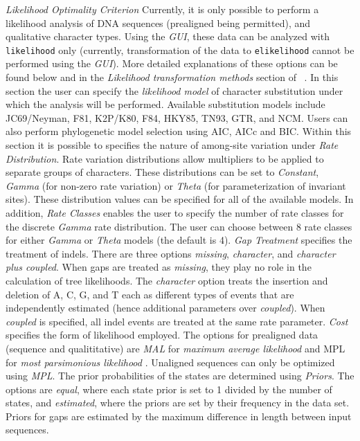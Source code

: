 \hangindent=1cm  \emph{Likelihood Optimality Criterion} Currently, it is only possible to perform 
a likelihood analysis of DNA sequences (prealigned being permitted), %
and qualitative 	character types. Using the \emph{GUI}, these data can be analyzed with 
\texttt{likelihood} only (currently, transformation of the data to \texttt{elikelihood} cannot be performed 
using the \emph{GUI}). More detailed explanations of these options can be found below and in the 
\emph{Likelihood transformation methods} section of  ~.
In this section the user can specify the \emph{likelihood model} of character 
substitution under which the analysis will be performed.  Available substitution models include JC69/Neyman, 
F81, K2P/K80, F84, HKY85, TN93, GTR, and NCM.  Users can also perform phylogenetic model 
selection using AIC, AICc and BIC.  Within this section it is possible to specifies 
the nature of among-site variation under \emph{Rate Distribution}.  Rate variation distributions allow 
multipliers to be applied to separate groups of characters. 
These distributions can be set to \emph{Constant}, \emph{Gamma} (for non-zero 
rate variation) or  \emph{Theta} (for parameterization of invariant sites).  These distribution
values can be specified for all of the available models. In addition, \emph{Rate Classes} enables the user to 
specify the number of rate classes for the discrete \emph{Gamma} rate distribution. 
The user can choose between 8 rate classes for either \emph{Gamma} or \emph{Theta}
models (the default is 4).  \emph{Gap Treatment}  specifies the treatment of indels.  There are 
three options \emph{missing},  \emph{character}, and \emph{character plus coupled}.  When gaps are treated 
as \emph{missing}, they play no role in the calculation of tree likelihoods.  The \emph{character} 
option treats the insertion and deletion of A, C, G, and T each as different types of events that are 
independently estimated (hence additional parameters over \emph{coupled}). When \emph{coupled} 
is specified, all indel events are treated at the same rate parameter. 
\emph{Cost} specifies the form of likelihood employed.  The options for prealigned data 
(sequence and qualititative) are \emph{MAL} for \emph{maximum average likelihood} and {MPL} for 
\emph{most parsimonious likelihood} \cite{barryandhartigan1987}. Unaligned sequences can only be 
optimized using \emph{MPL}.  The prior probabilities of the states are determined using \emph{Priors}.   
The options are \emph{equal}, where each state prior is set to 1 divided by the number of states, and 
\emph{estimated}, where the priors are set by their frequency in the data set.  Priors for gaps are estimated 
by the maximum difference in length between input sequences.

